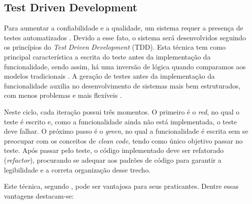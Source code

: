 \subsection{Test Driven Development}
\label{subsec:tdd}

Para aumentar a confiabilidade e a qualidade, um sistema requer a presença de testes automatizados \cite{myers2004art}. Devido a esse fato, o sistema será desenvolvidos seguindo os princípios do \textit{Test} \textit{Driven} \textit{Development} (TDD). Esta técnica tem como principal característica a escrita do teste antes da implementação da funcionalidade, sendo assim, há uma inversão de lógica quando comparamos aos modelos tradicionais \cite{erdogmus2005effectiveness}. A geração de testes antes da implementação da funcionalidade auxilia no desenvolvimento de sistemas mais bem estruturados, com menos problemas e mais flexíveis \cite{melnik2007empirical}.

Neste ciclo, cada iteração possui três momentos. O primeiro é o \textit{red}, no qual o teste é escrito e, como a funcionalidade ainda não está implementada, o teste deve falhar. O próximo passo é o \textit{green}, no qual a funcionalidade é escrita sem se preocupar com os conceitos de \textit{clean} \textit{code}, tendo como único objetivo passar no teste. Após passar pelo teste, o código implementado deve ser refatorado (\textit{refactor}), procurando se adequar aos padrões de código para garantir a legibilidade e a correta organização desse trecho.

Este técnica, segundo , pode ser vantajosa para seus praticantes. Dentre essas vantagens destacam-se:


